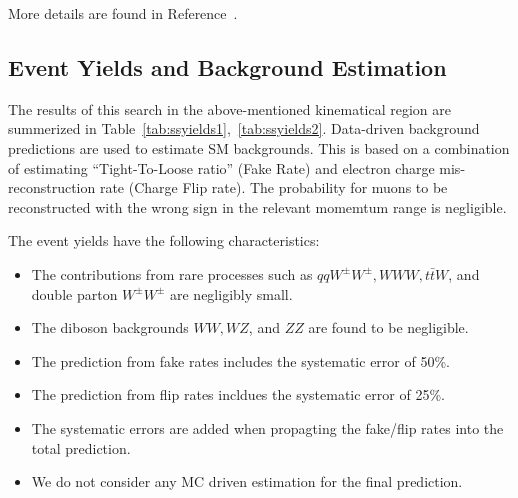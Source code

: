 More details are found in Reference~\cite{ssnote2011}.

\subsection{Event Yields and Background Estimation}
\label{eventsel}

The results of this search in the above-mentioned kinematical region are summerized in Table~\ref{tab:ssyields1},~\ref{tab:ssyields2}. Data-driven background 
predictions are used to estimate SM backgrounds. This is based on a combination of estimating ``Tight-To-Loose ratio'' (Fake Rate)
and electron charge mis-reconstruction rate (Charge Flip rate). The probability for muons to be reconstructed 
with the wrong sign in the relevant momemtum range is negligible.

The event yields have the following characteristics:

\begin{itemize}
\item The contributions from rare processes such as $qqW^\pm W^\pm, WWW, t\bar{t}W$, and double parton $W^\pm W^\pm$ are negligibly small.
\item The diboson backgrounds $WW, WZ$, and $ZZ$ are found to be negligible.
\item The prediction from fake rates includes the systematic error of 50\%.
\item The prediction from flip rates incldues the systematic error of 25\%.
\item The systematic errors are added when propagting the fake/flip rates into the total prediction.
\item We do not consider any MC driven estimation for the final prediction.
\end{itemize}

